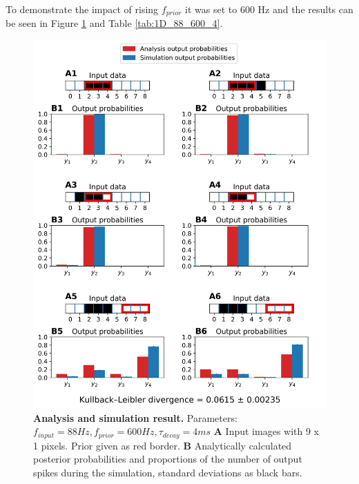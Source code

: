 To demonstrate the impact of rising $f_{prior}$ it was set to 600 Hz and the results can be seen in Figure \ref{fig:1D_88_600_4} and Table \ref{tab:1D_88_600_4}.

\begin{figure}
  \includegraphics[width=\linewidth]{figures/1D/1D_88_600_4.png}
  \caption{\textbf{Analysis and simulation result. } Parameters: $f_{input} = 88 Hz, f_{prior} = 600 Hz, \tau_{decay} = 4 ms$ \textbf{A} Input images with 9 x 1 pixels. Prior given as red border. \textbf{B} Analytically calculated posterior probabilities and proportions of the number of output spikes during the simulation, standard deviations as black bars.}
  \label{fig:1D_88_600_4}
\end{figure}

